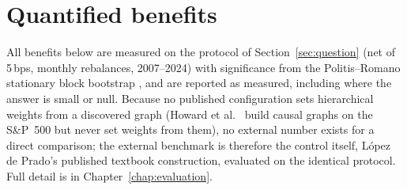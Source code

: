 \section{Quantified benefits}
\label{sec:benefits}

All benefits below are measured on the protocol of
Section~\ref{sec:question} (net of 5\,bps, monthly rebalances, 2007--2024)
with significance from the Politis--Romano stationary block bootstrap
\cite{politis1994stationary}, and are reported as measured, including
where the answer is small or null. Because no published configuration sets
hierarchical weights from a discovered graph (Howard et al.\
\cite{howard2025causal} build causal graphs on the S\&P~500 but never set
weights from them), no external number exists for a direct comparison;
the external benchmark is therefore the \HRP{} control itself, L\'opez de
Prado's published textbook construction, evaluated on the identical
protocol. Full detail is in Chapter~\ref{chap:evaluation}.

